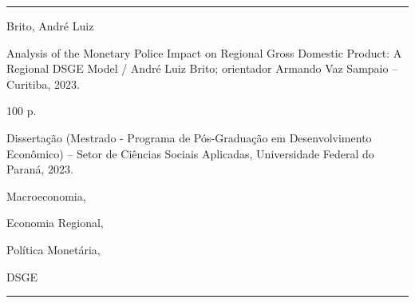\documentclass[../thesis.tex]{subfiles}
\begin{document}
	\newpage
	
	\null
	\vfill
	\hrule
	\vspace*{-0.3cm}
	
	{\singlespacing
		
	Brito, André Luiz

	\hspace{0.5cm} Analysis of the Monetary Police Impact on Regional Gross Domestic Product: A Regional DSGE Model / André Luiz Brito; orientador Armando Vaz Sampaio -- Curitiba, 2023.
	
	\hspace{0.5cm} 100 p.
	
	\hspace{0.5cm} Dissertação (Mestrado - Programa de Pós-Graduação em Desenvolvimento Econômico) -- Setor de Ciências Sociais Aplicadas, Universidade Federal do Paraná, 2023.
	
	\hspace{0.5cm} 
	\begin{enumerate*}[label=\arabic*.]
		\item Macroeconomia, 
		\item Economia Regional, 
		\item Política Monetária,
		\item DSGE
	\end{enumerate*}		
	
	}	
		
	\vspace*{0.5cm}
	
	\hrule
	
	\vspace*{1cm}
	
	\thispagestyle{empty}
	
\end{document}
